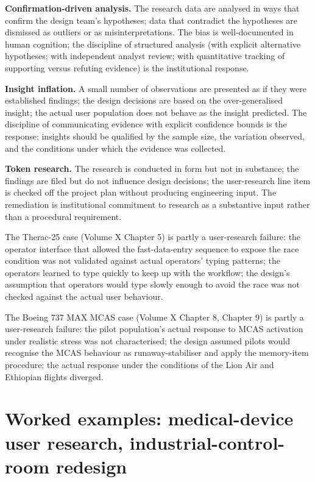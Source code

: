 \textbf{Confirmation-driven analysis.} The research data are analysed in ways that confirm the design team's hypotheses; data that contradict the hypotheses are dismissed as outliers or as misinterpretations. The bias is well-documented in human cognition; the discipline of structured analysis (with explicit alternative hypotheses; with independent analyst review; with quantitative tracking of supporting versus refuting evidence) is the institutional response.

\textbf{Insight inflation.} A small number of observations are presented as if they were established findings; the design decisions are based on the over-generalised insight; the actual user population does not behave as the insight predicted. The discipline of communicating evidence with explicit confidence bounds is the response; insights should be qualified by the sample size, the variation observed, and the conditions under which the evidence was collected.

\textbf{Token research.} The research is conducted in form but not in substance; the findings are filed but do not influence design decisions; the user-research line item is checked off the project plan without producing engineering input. The remediation is institutional commitment to research as a substantive input rather than a procedural requirement.

The Therac-25 case (Volume X Chapter 5) is partly a user-research failure: the operator interface that allowed the fast-data-entry sequence to expose the race condition was not validated against actual operators' typing patterns; the operators learned to type quickly to keep up with the workflow; the design's assumption that operators would type slowly enough to avoid the race was not checked against the actual user behaviour.

The Boeing 737 MAX MCAS case (Volume X Chapter 8, Chapter 9) is partly a user-research failure: the pilot population's actual response to MCAS activation under realistic stress was not characterised; the design assumed pilots would recognise the MCAS behaviour as runaway-stabiliser and apply the memory-item procedure; the actual response under the conditions of the Lion Air and Ethiopian flights diverged.

\section{Worked examples: medical-device user research, industrial-control-room redesign}


